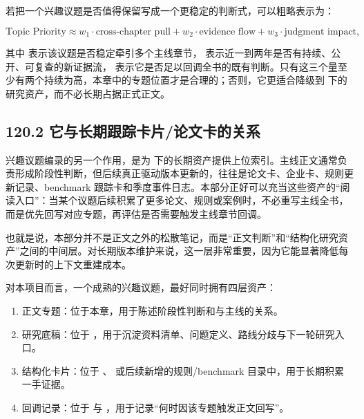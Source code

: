 若把一个兴趣议题是否值得保留写成一个更稳定的判断式，可以粗略表示为：

\begingroup
\scriptsize
\begin{equation*}
\text{Topic Priority} \approx w_1 \cdot \text{cross-chapter pull} + w_2 \cdot \text{evidence flow} + w_3 \cdot \text{judgment impact},
\end{equation*}
\endgroup

其中 \texttt{} 表示该议题是否稳定牵引多个主线章节，\texttt{} 表示近一到两年是否有持续、公开、可复查的新证据流，\texttt{} 表示它是否足以回调全书的既有判断。只有这三个量至少有两个持续为高，本章中的专题位置才是合理的；否则，它更适合降级到  下的研究资产，而不必长期占据正式正文。

\subsection*{120.2 它与长期跟踪卡片/论文卡的关系}


兴趣议题编录的另一个作用，是为  下的长期资产提供上位索引。主线正文通常负责形成阶段性判断，但后续真正驱动版本更新的，往往是论文卡、企业卡、规则更新记录、benchmark 跟踪卡和季度事件日志。本部分正好可以充当这些资产的“阅读入口”：当某个议题后续积累了更多论文、规则或案例时，不必重写主线全书，而是优先回写对应专题，再评估是否需要触发主线章节回调。

也就是说，本部分并不是正文之外的松散笔记，而是“正文判断”和“结构化研究资产”之间的中间层。对长期版本维护来说，这一层非常重要，因为它能显著降低每次更新时的上下文重建成本。

对本项目而言，一个成熟的兴趣议题，最好同时拥有四层资产：

\begin{enumerate}
\item 正文专题：位于本章，用于陈述阶段性判断和与主线的关系。
\item 研究底稿：位于 ，用于沉淀资料清单、问题定义、路线分歧与下一轮研究入口。
\item 结构化卡片：位于 、 或后续新增的规则/benchmark 目录中，用于长期积累一手证据。
\item 回调记录：位于  与 ，用于记录“何时因该专题触发正文回写”。
\end{enumerate}

